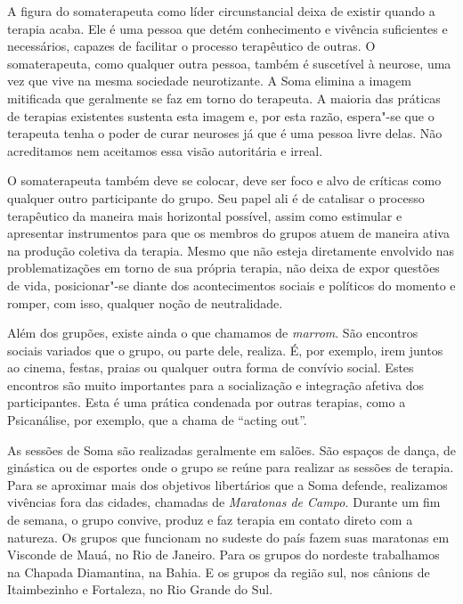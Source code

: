 A figura do somaterapeuta como líder circunstancial deixa de existir
quando a terapia acaba. Ele é uma pessoa que detém conhecimento e
vivência suficientes e necessários, capazes de facilitar o processo
terapêutico de outras. O somaterapeuta, como qualquer outra pessoa,
também é suscetível à neurose, uma vez que vive na mesma sociedade
neurotizante. A Soma elimina a imagem mitificada que geralmente se faz
em torno do terapeuta. A maioria das práticas de terapias existentes
sustenta esta imagem e, por esta razão, espera"-se que o terapeuta tenha
o poder de curar neuroses já que é uma pessoa livre delas. Não
acreditamos nem aceitamos essa visão autoritária e irreal.

O somaterapeuta também deve se colocar, deve ser foco e alvo de críticas
como qualquer outro participante do grupo. Seu papel ali é de catalisar
o processo terapêutico da maneira mais horizontal possível, assim como
estimular e apresentar instrumentos para que os membros do grupos atuem
de maneira ativa na produção coletiva da terapia. Mesmo que não esteja
diretamente envolvido nas problematizações em torno de sua própria
terapia, não deixa de expor questões de vida, posicionar"-se diante dos
acontecimentos sociais e políticos do momento e romper, com isso,
qualquer noção de neutralidade.

Além dos grupões, existe ainda o que chamamos de \emph{marrom}. São
encontros sociais variados que o grupo, ou parte dele, realiza. É, por
exemplo, irem juntos ao cinema, festas, praias ou qualquer outra forma
de convívio social. Estes encontros são muito importantes para a
socialização e integração afetiva dos participantes. Esta é uma prática
condenada por outras terapias, como a Psicanálise, por exemplo, que a
chama de ``acting out''.

As sessões de Soma são realizadas geralmente em salões. São espaços de
dança, de ginástica ou de esportes onde o grupo se reúne para realizar as
sessões de terapia. Para se aproximar mais dos objetivos libertários que
a Soma defende, realizamos vivências fora das cidades, chamadas de
\emph{Maratonas de Campo.} Durante um fim de semana, o grupo convive,
produz e faz terapia em contato direto com a natureza. Os grupos que
funcionam no sudeste do país fazem suas maratonas em Visconde de Mauá,
no Rio de Janeiro. Para os grupos do nordeste trabalhamos na Chapada
Diamantina, na Bahia. E os grupos da região sul, nos cânions de
Itaimbezinho e Fortaleza, no Rio Grande do Sul.

